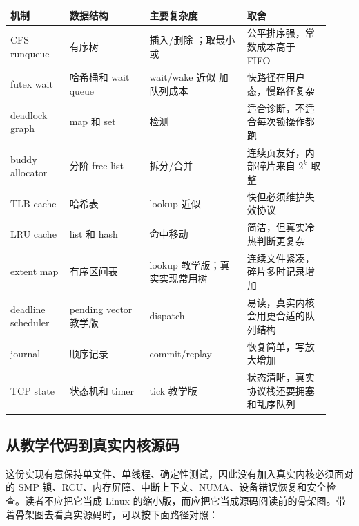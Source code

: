 \begin{longtable}{@{}L{0.17\linewidth}L{0.23\linewidth}L{0.28\linewidth}L{0.24\linewidth}@{}}
\toprule
机制 & 数据结构 & 主要复杂度 & 取舍 \\
\midrule
CFS runqueue & 有序树 & 插入/删除 ；取最小  或  & 公平排序强，常数成本高于 FIFO \\
futex wait & 哈希桶和 wait queue & wait/wake 近似  加队列成本 & 快路径在用户态，慢路径复杂 \\
deadlock graph & map 和 set & 检测  & 适合诊断，不适合每次锁操作都跑 \\
buddy allocator & 分阶 free list & 拆分/合并  & 连续页友好，内部碎片来自 $2^k$ 取整 \\
TLB cache & 哈希表 & lookup 近似  & 快但必须维护失效协议 \\
LRU cache & list 和 hash & 命中移动  & 简洁，但真实冷热判断更复杂 \\
extent map & 有序区间表 & lookup  教学版；真实实现常用树 & 连续文件紧凑，碎片多时记录增加 \\
deadline scheduler & pending vector 教学版 & dispatch  & 易读，真实内核会用更合适的队列结构 \\
journal & 顺序记录 & commit/replay  & 恢复简单，写放大增加 \\
TCP state & 状态机和 timer & tick  教学版 & 状态清晰，真实协议栈还要拥塞和乱序队列 \\
\bottomrule
\end{longtable}

\subsection{从教学代码到真实内核源码}

这份实现有意保持单文件、单线程、确定性测试，因此没有加入真实内核必须面对的 SMP 锁、RCU、内存屏障、中断上下文、NUMA、设备错误恢复和安全检查。读者不应把它当成 Linux 的缩小版，而应把它当成源码阅读前的骨架图。带着骨架图去看真实源码时，可以按下面路径对照：

